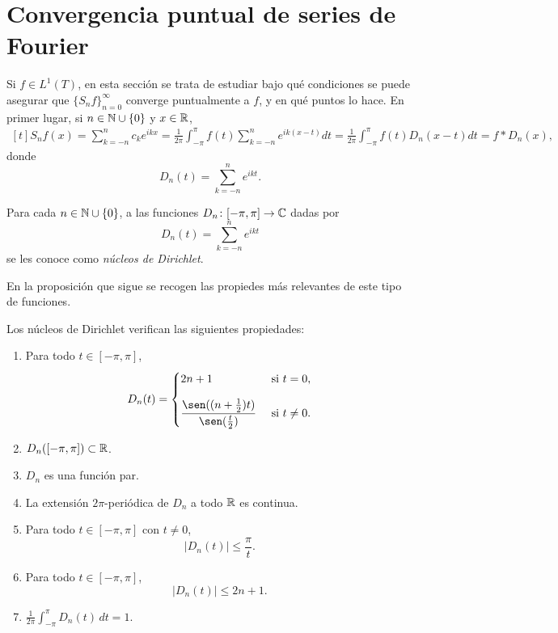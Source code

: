 \documentclass[a4paper, 11pt, oneside]{report}
\begin{document}
\section{Convergencia puntual de series de Fourier}

Si $f \in L^1(T)$, en esta sección se trata de estudiar bajo qué condiciones se puede asegurar que $\{S_nf\}_{n=0}^\infty$ converge puntualmente a $f$, y en qué puntos lo hace. En primer lugar, si $n \in \mathbb N \cup \{0\}$ y $x \in \mathbb R$,
\[\begin{aligned}[t]
  S_nf(x) = \sum_{k=-n}^n c_ke^{ikx} = \frac{1}{2\pi}\int_{-\pi}^\pi f(t)\sum_{k=-n}^ne^{ik(x-t)} dt =\frac{1}{2\pi}\int_{-\pi}^\pi f(t)D_n(x-t) dt= f \ast D_n(x), 
\end{aligned}\]
donde 
\[D_n(t) = \sum_{k=-n}^n e^{ikt}.\]

\begin{definition}
  Para cada $n \in \mathbb N \cup \{0\}$, a las funciones $D_n \colon [-\pi,\pi] \to \mathbb C$ dadas por 
  \[D_n(t) = \sum_{k=-n}^n e^{ikt}\]
  se les conoce como \emph{núcleos de Dirichlet}.
\end{definition}

En la proposición que sigue se recogen las propiedes más relevantes de este tipo de funciones.

\begin{proposition}\label{pro:4.2.2}
  Los núcleos de Dirichlet verifican las siguientes propiedades:
  \begin{enumerate}
    \item Para todo $t \in [-\pi,\pi]$, 
    \[ D_n(t) = \begin{cases}
      2n+1 & $ si $ t = 0, \\[10pt]
      \displaystyle \frac{\sen((n+\frac{1}{2})t)}{\sen(\frac{t}{2})} & $ si $ t \neq 0.
    \end{cases}\]
    \item $D_n([-\pi,\pi]) \subset \mathbb R$.
    \item $D_n$ es una función par.
    \item La extensión $2\pi$-periódica de $D_n$ a todo $\mathbb R$ es continua.
    \item Para todo $t \in [-\pi, \pi]$ con $t \neq 0$,
    \[|D_n(t)| \leq \frac{\pi}{t}.\]
    \item Para todo $t \in [-\pi,\pi]$,
    \[|D_n(t)| \leq 2n+1.\]
    \item $\displaystyle \frac{1}{2\pi}\int_{-\pi}^\pi D_n(t) \, dt = 1.$
  \end{enumerate}
\end{proposition}
\end{document}
